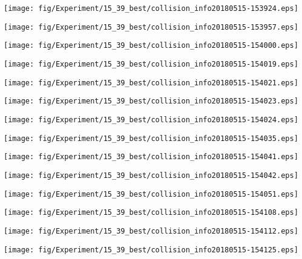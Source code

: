 \texttt{[image: fig/Experiment/15\_39\_best/collision\_info20180515-153924.eps]}

\texttt{[image: fig/Experiment/15\_39\_best/collision\_info20180515-153957.eps]}

\texttt{[image: fig/Experiment/15\_39\_best/collision\_info20180515-154000.eps]}

\texttt{[image: fig/Experiment/15\_39\_best/collision\_info20180515-154019.eps]}

\texttt{[image: fig/Experiment/15\_39\_best/collision\_info20180515-154021.eps]}

\texttt{[image: fig/Experiment/15\_39\_best/collision\_info20180515-154023.eps]}

\texttt{[image: fig/Experiment/15\_39\_best/collision\_info20180515-154024.eps]}

\texttt{[image: fig/Experiment/15\_39\_best/collision\_info20180515-154035.eps]}

\texttt{[image: fig/Experiment/15\_39\_best/collision\_info20180515-154041.eps]}

\texttt{[image: fig/Experiment/15\_39\_best/collision\_info20180515-154042.eps]}

\texttt{[image: fig/Experiment/15\_39\_best/collision\_info20180515-154051.eps]}

\texttt{[image: fig/Experiment/15\_39\_best/collision\_info20180515-154108.eps]}

\texttt{[image: fig/Experiment/15\_39\_best/collision\_info20180515-154112.eps]}

\texttt{[image: fig/Experiment/15\_39\_best/collision\_info20180515-154125.eps]}
